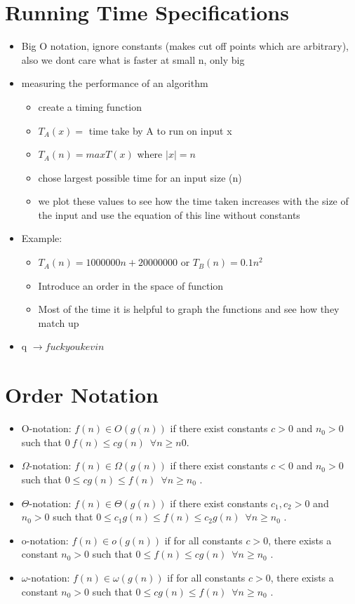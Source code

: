 \documentclass[12pt]{article}
\begin{document}
\section*{Running Time Specifications}
\begin{itemize}
\item Big O notation, ignore constants (makes cut off points which are arbitrary), also we dont care what is faster at small n, only big
\item measuring the performance of an algorithm
\begin{itemize}
\item create a timing function
\item $T_{A}(x) =$ time take by A to run on input x 
\item $T_{A}(n) = maxT(x)$  where $|x|=n$
\item chose largest possible time for an input size (n)
\item we plot these values to see how the time taken increases with the size of the input and use the equation of this line without constants
\end{itemize}
\item Example:
\begin{itemize}
\item $T_{A}(n) = 1000000n + 20000000$ or $T_{B}(n) = 0.1n^2$
\item Introduce an order in the space of function
\item Most of the time it is helpful to graph the functions and see how they match up 
\end{itemize}
\item q $\rightarrow fuck you kevin$
\end{itemize}

\section*{Order Notation}
\begin{itemize}
\item O-notation: $f(n) \in O(g(n))$ if there exist constants $c > 0$ and $n_{0} > 0$
such that $0 \ f(n) \leq  cg(n) \enspace \forall  n \geq n 0$.
\item $\Omega$-notation: $f(n) \in  \Omega(g(n))$ if there exist constants $c < 0$ and $n_{0} > 0$ such that $0 \leq cg(n) \leq f(n) \enspace \forall n \geq n_{0}$ .
\item $\Theta$-notation: $f(n) \in \Theta(g(n))$ if there exist constants $c_{1} , c_{2} > 0$ and $n_{0} > 0$ such that $0 \leq c _{1}g(n) \leq f(n) \leq c_{2}g(n) \enspace \forall n \geq n_{0}$ .
\item o-notation: $f(n) \in o(g(n))$ if for all constants $c > 0$, there exists a
constant $n_{0} > 0$ such that $0 \leq f(n) \leq cg(n) \enspace \forall n \geq n_{0}$ .
\item $\omega$-notation: $f(n) \in \omega(g(n))$ if for all constants $c > 0$, there exists a constant $n_{0} > 0$ such that $0 \leq cg(n) \leq f(n) \enspace \forall n \geq n_{0}$ .
\end{itemize}
\end{document}
